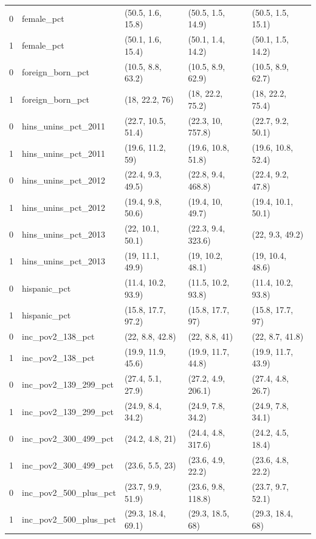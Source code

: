 \begin{table}[ht]
\begin{tabular}{rllll}
  0 & female\_pct & (50.5, 1.6, 15.8) & (50.5, 1.5, 14.9) & (50.5, 1.5, 15.1) \\ 
  1 & female\_pct & (50.1, 1.6, 15.4) & (50.1, 1.4, 14.2) & (50.1, 1.5, 14.2) \\ 
  0 & foreign\_born\_pct & (10.5, 8.8, 63.2) & (10.5, 8.9, 62.9) & (10.5, 8.9, 62.7) \\ 
  1 & foreign\_born\_pct & (18, 22.2, 76) & (18, 22.2, 75.2) & (18, 22.2, 75.4) \\ 
  0 & hins\_unins\_pct\_2011 & (22.7, 10.5, 51.4) & (22.3, 10, 757.8) & (22.7, 9.2, 50.1) \\ 
  1 & hins\_unins\_pct\_2011 & (19.6, 11.2, 59) & (19.6, 10.8, 51.8) & (19.6, 10.8, 52.4) \\ 
  0 & hins\_unins\_pct\_2012 & (22.4, 9.3, 49.5) & (22.8, 9.4, 468.8) & (22.4, 9.2, 47.8) \\ 
  1 & hins\_unins\_pct\_2012 & (19.4, 9.8, 50.6) & (19.4, 10, 49.7) & (19.4, 10.1, 50.1) \\ 
  0 & hins\_unins\_pct\_2013 & (22, 10.1, 50.1) & (22.3, 9.4, 323.6) & (22, 9.3, 49.2) \\ 
  1 & hins\_unins\_pct\_2013 & (19, 11.1, 49.9) & (19, 10.2, 48.1) & (19, 10.4, 48.6) \\ 
  0 & hispanic\_pct & (11.4, 10.2, 93.9) & (11.5, 10.2, 93.8) & (11.4, 10.2, 93.8) \\ 
  1 & hispanic\_pct & (15.8, 17.7, 97.2) & (15.8, 17.7, 97) & (15.8, 17.7, 97) \\ 
  0 & inc\_pov2\_138\_pct & (22, 8.8, 42.8) & (22, 8.8, 41) & (22, 8.7, 41.8) \\ 
  1 & inc\_pov2\_138\_pct & (19.9, 11.9, 45.6) & (19.9, 11.7, 44.8) & (19.9, 11.7, 43.9) \\ 
  0 & inc\_pov2\_139\_299\_pct & (27.4, 5.1, 27.9) & (27.2, 4.9, 206.1) & (27.4, 4.8, 26.7) \\ 
  1 & inc\_pov2\_139\_299\_pct & (24.9, 8.4, 34.2) & (24.9, 7.8, 34.2) & (24.9, 7.8, 34.1) \\ 
  0 & inc\_pov2\_300\_499\_pct & (24.2, 4.8, 21) & (24.4, 4.8, 317.6) & (24.2, 4.5, 18.4) \\ 
  1 & inc\_pov2\_300\_499\_pct & (23.6, 5.5, 23) & (23.6, 4.9, 22.2) & (23.6, 4.8, 22.2) \\ 
  0 & inc\_pov2\_500\_plus\_pct & (23.7, 9.9, 51.9) & (23.6, 9.8, 118.8) & (23.7, 9.7, 52.1) \\ 
  1 & inc\_pov2\_500\_plus\_pct & (29.3, 18.4, 69.1) & (29.3, 18.5, 68) & (29.3, 18.4, 68) \\ 

\end{tabular}
\end{table}
